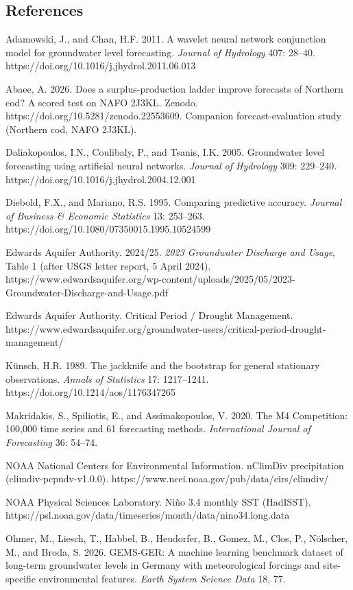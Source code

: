 \documentclass[11pt]{article}
\begin{document}
\subsection{References}\label{references}

Adamowski, J., and Chan, H.F. 2011. A wavelet neural network conjunction
model for groundwater level forecasting. \emph{Journal of Hydrology}
407: 28--40. https://doi.org/10.1016/j.jhydrol.2011.06.013

Abaee, A. 2026. Does a surplus-production ladder improve forecasts of
Northern cod? A scored test on NAFO 2J3KL. Zenodo.
https://doi.org/10.5281/zenodo.22553609. Companion forecast-evaluation
study (Northern cod, NAFO 2J3KL).

Daliakopoulos, I.N., Coulibaly, P., and Tsanis, I.K. 2005. Groundwater
level forecasting using artificial neural networks. \emph{Journal of
Hydrology} 309: 229--240. https://doi.org/10.1016/j.jhydrol.2004.12.001

Diebold, F.X., and Mariano, R.S. 1995. Comparing predictive accuracy.
\emph{Journal of Business \& Economic Statistics} 13: 253--263.
https://doi.org/10.1080/07350015.1995.10524599

Edwards Aquifer Authority. 2024/25. \emph{2023 Groundwater Discharge and
Usage}, Table 1 (after USGS letter report, 5 April 2024).
https://www.edwardsaquifer.org/wp-content/uploads/2025/05/2023-Groundwater-Discharge-and-Usage.pdf

Edwards Aquifer Authority. Critical Period / Drought Management.
https://www.edwardsaquifer.org/groundwater-users/critical-period-drought-management/

Künsch, H.R. 1989. The jackknife and the bootstrap for general
stationary observations. \emph{Annals of Statistics} 17: 1217--1241.
https://doi.org/10.1214/aos/1176347265

Makridakis, S., Spiliotis, E., and Assimakopoulos, V. 2020. The M4
Competition: 100,000 time series and 61 forecasting methods.
\emph{International Journal of Forecasting} 36: 54--74.

NOAA National Centers for Environmental Information. nClimDiv
precipitation (climdiv-pcpndv-v1.0.0).
https://www.ncei.noaa.gov/pub/data/cirs/climdiv/

NOAA Physical Sciences Laboratory. Niño 3.4 monthly SST (HadISST).
https://psl.noaa.gov/data/timeseries/month/data/nino34.long.data

Ohmer, M., Liesch, T., Habbel, B., Heudorfer, B., Gomez, M., Clos, P.,
Nölscher, M., and Broda, S. 2026. GEMS-GER: A machine learning benchmark
dataset of long-term groundwater levels in Germany with meteorological
forcings and site-specific environmental features. \emph{Earth System
Science Data} 18, 77.
\end{document}

